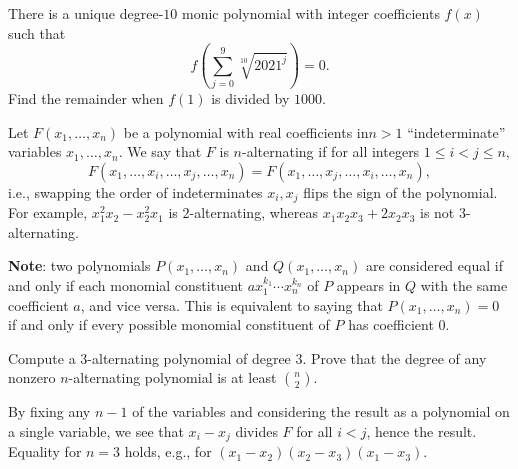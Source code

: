 \documentclass[11pt]{article}
\theoremstyle{definition}
\begin{document}
\begin{question}[name={2021-22 CHMMC Winter, Team Round, \href{https://artofproblemsolving.com/community/c126h2825800p24986001}{Problem 6}}]
	There is a unique degree-$10$ monic polynomial with integer coefficients $f(x)$ such that
	$$f \left( \sum^9_{j=0}\sqrt[10]{2021^j}\right)= 0.$$ Find the remainder when $f(1)$ is divided by $1000$.
\end{question}




%	


\begin{question}[name={2021-22 CHMMC Winter, Proof Round, \href{https://artofproblemsolving.com/community/c126h2916225p26045386}{Problem 3}}]
	Let $F(x_1,\dots, x_n)$ be a polynomial with real coefficients in$ n > 1$ ``indeterminate'' variables $x_1,\dots, x_n$. We say that $F$ is $n$-alternating if for all integers $1 \le i < j \le n$,$$F(x_1,\dots, x_i,\dots, x_j,\dots, x_n) =F(x_1,\dots, x_j,\dots, x_i,\dots, x_n),$$i.e., swapping the order of indeterminates $x_i, x_j$ flips the sign of the polynomial. For example, $x^2_1x_2 - x^2_2x_1$ is $2$-alternating, whereas $x_1x_2x_3 +2x_2x_3$ is not $3$-alternating.
	
	\textbf{Note}: two polynomials $P(x_1,\dots, x_n)$ and $Q(x_1,\dots, x_n)$ are considered equal if and only if each monomial constituent $ax^{k_1}_1\cdots x^{k_n}_n$ of $P$ appears in $Q$ with the same coefficient $a$, and vice versa. This is equivalent to saying that $P(x_1,\dots, x_n) = 0$ if and only if every possible monomial constituent of $P$ has coefficient $0$.
	\begin{tasks}
		\task Compute a $3$-alternating polynomial of degree $3$.
		\task Prove that the degree of any nonzero $n$-alternating polynomial is at least ${n \choose 2}$.
	\end{tasks}
\end{question}

\begin{solution}[name={Solution by Assassino9931}]
	By fixing any $n-1$ of the variables and considering the result as a polynomial on a single variable, we see that $x_i - x_j$ divides $F$ for all $i < j$, hence the result. Equality for $n=3$ holds, e.g., for $(x_1 - x_2)(x_2 - x_3)(x_1 - x_3)$.
\end{solution}
\end{document}
